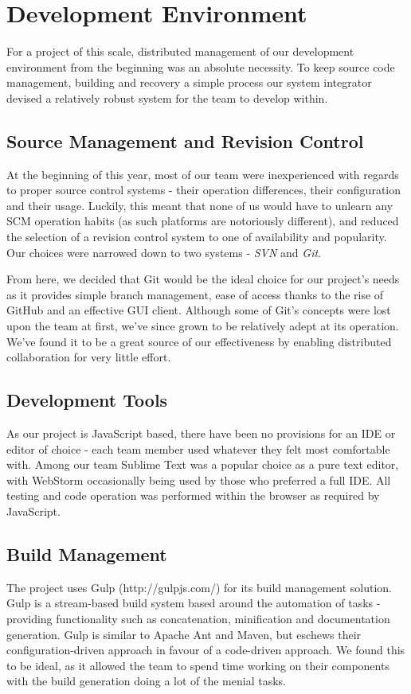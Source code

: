 \documentclass{l3proj}
\begin{document}
\chapter{Development Environment}
\label{dev}
For a project of this scale, distributed management of our development environment from the beginning was an absolute necessity. To keep source code management, building and recovery a simple process our system integrator devised a relatively robust system for the team to develop within.
\section{Source Management and Revision Control}
\label{dev-scm}
At the beginning of this year, most of our team were inexperienced with regards to proper source control systems - their operation differences, their configuration and their usage. Luckily, this meant that none of us would have to unlearn any SCM operation habits (as such platforms are notoriously different), and reduced the selection of a revision control system to one of availability and popularity. Our choices were narrowed down to two systems - \textit{SVN} and \textit{Git}.

From here, we decided that Git would be the ideal choice for our project's needs as it provides simple branch management, ease of access thanks to the rise of GitHub and an effective GUI client. Although some of Git's concepts were lost upon the team at first, we've since grown to be relatively adept at its operation. We've found it to be a great source of our effectiveness by enabling distributed collaboration for very little effort.

\section{Development Tools}
\label{dev-tools}
As our project is JavaScript based, there have been no provisions for an IDE or editor of choice - each team member used whatever they felt most comfortable with. Among our team Sublime Text was a popular choice as a pure text editor, with WebStorm occasionally being used by those who preferred a full IDE. All testing and code operation was performed within the browser as required by JavaScript.

\section{Build Management}
\label{dev-build}
The project uses Gulp (http://gulpjs.com/) for its build management solution. Gulp is a stream-based build system based around the automation of tasks - providing functionality such as concatenation, minification and documentation generation. Gulp is similar to Apache Ant and Maven, but eschews their configuration-driven approach in favour of a code-driven approach. We found this to be ideal, as it allowed the team to spend time working on their components with the build generation doing a lot of the menial tasks.
\end{document}
